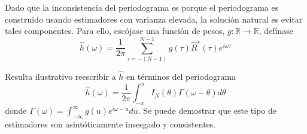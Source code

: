 \documentclass[12pt,letterpaper]{book}
\newcommand{\R}{\mathbb{R}}
\newcommand{\intR}{\int_{-\infty}^{\infty}}
\newcommand{\intPI}{\int_{-\pi}^{\pi}}
\begin{document}
Dado que la inconsistencia del periodograma es porque el periodograma es construido usando 
estimadores con varianza elevada, la solución natural es evitar tales componentes. Para ello, 
escójase una función de pesos, $g: \R \rightarrow \R$, defínase
%
\begin{equation}
\widehat{h}(\omega) = \frac{1}{2 \pi} \sum_{\tau = -(N-1)}^{N-1} g(\tau) \widehat{R}^{\star}(\tau) 
e^{i \omega \tau} 
\label{txt_estimador}
\end{equation}

Resulta ilustrativo reescribir a $\widehat{h}$ en términos del periodograma
\begin{equation*}
\widehat{h}(\omega) = \frac{1}{2 \pi} \intPI I_N(\theta) \Gamma(\omega - \theta) d\theta
\end{equation*}
donde $\Gamma(\omega) = \intR g(u) e^{i \omega -u } du$.
%
Se puede demostrar que este tipo de estimadores son asintóticamente insesgado y consistentes.
\end{document}
